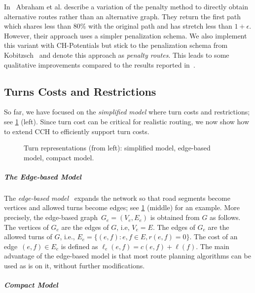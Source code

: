 \documentclass[a4paper, english, cleveref]{lipics-v2021}
\begin{document}
In~\cite{adgw-arrn-13} Abraham et al. describe a variation of the penalty method to directly obtain alternative routes rather than an alternative graph.
They return the first path which shares less than 80\% with the original path and has stretch less than $1+\epsilon$.
However, their approach uses a simpler penalization schema.
We also implement this variant with CH-Potentials but stick to the penalization schema from Kobitzsch~\cite{kobitzsch2015alternative} and denote this approach as \emph{penalty routes}.
This leads to some qualitative improvements compared to the results reported in~\cite{adgw-arrn-13}.

\subsection{Turns Costs and Restrictions}

So far, we have focused on the \emph{simplified model} where turn costs and restrictions; see \cref{fig:turn-representation} (left).
Since turn cost can be critical for realistic routing, we now show how to extend CCH to efficiently support turn costs.

\begin{figure}[tb]
  \hfill
  \hfill
  \hfill
  \hfill\hspace{0pt}
  \caption{Turn representations (from left): simplified model, edge-based model, compact model.}
  \label{fig:turn-representation}
\end{figure}

\subparagraph{The Edge-based Model}

The \emph{edge-based model}~\cite{Caldwell61, Winter02} expands the network so that road segments become vertices and allowed turns become edges; see \cref{fig:turn-representation} (middle) for an example.
More precisely, the edge-based graph~$G_e = (V_e, E_e)$ is obtained from $G$ as follows.
The vertices of $G_e$ are the edges of $G$, i.e, $V_e = E$.
The edges of $G_e$ are the allowed turns of $G$, i.e., $E_e = \{(e, f): e, f \in E, r(e, f) = 0\}$.
The cost of an edge~$(e, f) \in E_e$ is defined as $\ell_e(e, f) = c(e, f) + \ell(f)$.
The main advantage of the edge-based model is that most route planning algorithms can be used as is on it, without further modifications.

\subparagraph{Compact Model}
\end{document}
